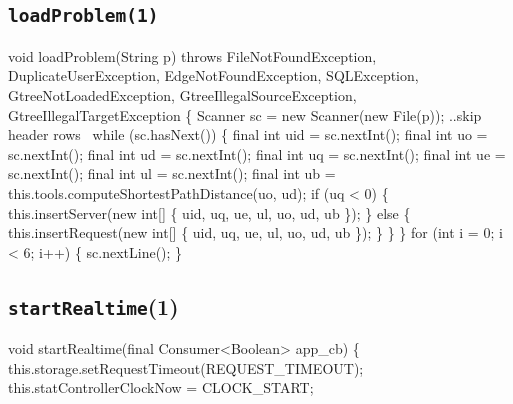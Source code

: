 \subsection{\texttt{loadProblem(1)}}
\nwenddocs{}\endmoddef{}
void loadProblem(String p)
throws FileNotFoundException, DuplicateUserException, EdgeNotFoundException, SQLException,
       GtreeNotLoadedException, GtreeIllegalSourceException, GtreeIllegalTargetException \{
  Scanner sc = new Scanner(new File(p));
  \LA{}..skip header rows~{\nwtagstyle{}}\RA{}
  while (sc.hasNext()) \{
    final int uid = sc.nextInt();
    final int  uo = sc.nextInt();
    final int  ud = sc.nextInt();
    final int  uq = sc.nextInt();
    final int  ue = sc.nextInt();
    final int  ul = sc.nextInt();
    final int  ub = this.tools.computeShortestPathDistance(uo, ud);
    if (uq < 0) \{
      this.insertServer(new int[] \{ uid, uq, ue, ul, uo, ud, ub \});
    \} else \{
      this.insertRequest(new int[] \{ uid, uq, ue, ul, uo, ud, ub \});
    \}
  \}
\}
\eatline
{}\nwendcode{}\endmoddef{}
for (int i = 0; i < 6; i++) \{
  sc.nextLine();
\}
\nwendcode{}\nwdocspar

\subsection{\texttt{startRealtime}(1)}
\nwenddocs{}\endmoddef{}
void startRealtime(final Consumer<Boolean> app_cb) \{
  this.storage.setRequestTimeout(REQUEST_TIMEOUT);
  this.statControllerClockNow = CLOCK_START;

